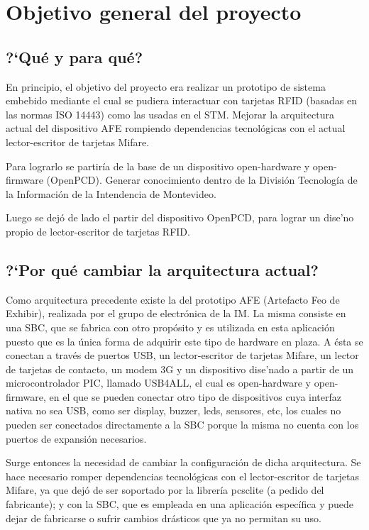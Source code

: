 \chapter{Objetivo general del proyecto}

\section{?`Qu\'e y para qu\'e?}

En principio, el objetivo del proyecto era realizar un prototipo de sistema embebido mediante el cual se pudiera interactuar con tarjetas RFID (basadas en las normas ISO 14443) como las usadas en el STM.
Mejorar la arquitectura actual del dispositivo AFE rompiendo dependencias tecnol\'ogicas con el actual lector-escritor de tarjetas Mifare.

Para lograrlo se partir\'ia de la base de un dispositivo open-hardware y open-firmware (OpenPCD).
Generar conocimiento dentro de la Divisi\'on Tecnolog\'ia de la Informaci\'on de la Intendencia de Montevideo.

Luego se dej\'o de lado el partir del dispositivo OpenPCD, para lograr un dise'no propio de lector-escritor de tarjetas RFID.

\section{?`Por qu\'e cambiar la arquitectura actual?}

Como arquitectura precedente existe la del prototipo AFE (Artefacto Feo de Exhibir), realizada por el grupo de electr\'onica de la IM. La misma consiste en una SBC, que se fabrica con otro prop\'osito y es utilizada en esta aplicaci\'on puesto que es la \'unica forma de adquirir este tipo de hardware en plaza. A \'esta se conectan a trav\'es de puertos USB, un lector-escritor de tarjetas Mifare, un lector de tarjetas de contacto, un modem 3G y un dispositivo dise'nado a partir de un microcontrolador PIC, llamado USB4ALL, el cual es open-hardware y open-firmware, en el que se pueden conectar otro tipo de dispositivos cuya interfaz nativa no sea USB, como ser display, buzzer, leds, sensores, etc, los cuales no pueden ser conectados directamente a la SBC porque la misma no cuenta con los puertos de expansi\'on necesarios.

Surge entonces la necesidad de cambiar la configuraci\'on de dicha arquitectura. Se hace necesario romper dependencias tecnol\'ogicas con el lector-escritor de tarjetas Mifare, ya que dej\'o de ser soportado por la librer\'ia pcsclite (a pedido del fabricante); y con la SBC, que es empleada en una aplicaci\'on espec\'ifica y puede dejar de fabricarse o sufrir cambios dr\'asticos que ya no permitan su uso.



